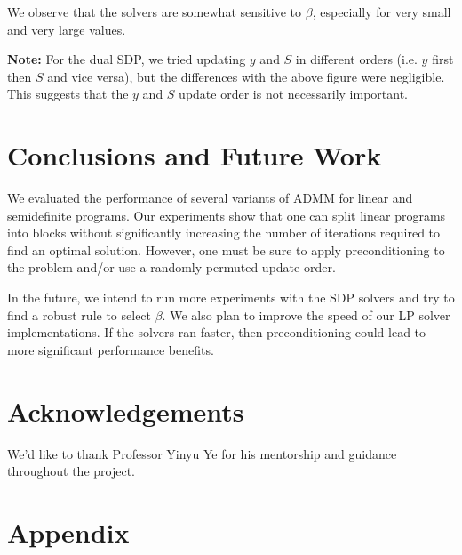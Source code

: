 \documentclass{article}
\begin{document}
We observe that the solvers are somewhat sensitive to $\beta$, especially for very small and very large values. 

\textbf{Note:} For the dual SDP, we tried updating $y$ and $S$ in different orders (i.e. $y$ first then $S$ and vice versa), but the differences with the above figure were negligible. This suggests that the $y$ and $S$ update order is not necessarily important.

\vspace{0.1in}
\section{Conclusions and Future Work}

We evaluated the performance of several variants of ADMM for linear and semidefinite programs. Our experiments show that one can split linear programs into blocks without significantly increasing the number of iterations required to find an optimal solution. However, one must be sure to apply preconditioning to the problem and/or use a randomly permuted update order. 

In the future, we intend to run more experiments with the SDP solvers and try to find a robust rule to select $\beta$. We also plan to improve the speed of our LP solver implementations. If the solvers ran faster, then preconditioning could lead to more significant performance benefits.

\section{Acknowledgements}

We'd like to thank Professor Yinyu Ye for his mentorship and guidance throughout the project. 

\section{Appendix}
\end{document}
